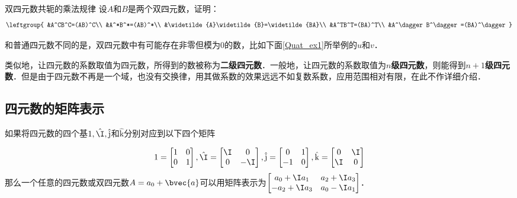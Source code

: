 \begin{exercise}{双四元数共轭的乘法规律}
设$A$和$B$是两个双四元数，证明：
\begin{equation}
\leftgroup{
&A^CB^C=(AB)^C\\
&A^*B^*=(AB)^*\\
&\widetilde{A}\widetilde{B}=\widetilde{BA}\\
&A^TB^T=(BA)^T\\
&A^\dagger B^\dagger=(BA)^\dagger
}
\end{equation}

\end{exercise}

和普通四元数不同的是，双四元数中有可能存在非零但模为0的数，比如下面\autoref{Quat_ex1}所举例的$u$和$v$．

类似地，让四元数的系数取值为四元数，所得到的数被称为\textbf{二级四元数}．一般地，让四元数的系数取值为$n$\textbf{级四元数}，则能得到$n+1$\textbf{级四元数}．但是由于四元数不再是一个域，也没有交换律，用其做系数的效果远远不如复数系数，应用范围相对有限，在此不作详细介绍．


\subsection{四元数的矩阵表示}

如果将四元数的四个基$1, \hat{\I}, \hat{\mathrm{j}}$和$\hat{\mathrm{k}}$分别对应到以下四个矩阵

\begin{equation}

1=\left[\begin{matrix}1&0\\0&1\end{matrix} \right], \hat{\I}=\left[\begin{matrix}\I&0\\0&-\I\end{matrix} \right], \hat{\mathrm{j}}=\left[\begin{matrix}0&1\\-1&0\end{matrix} \right], \hat{\mathrm{k}}=\left[\begin{matrix}0&\I\\\I&0\end{matrix} \right]

\end{equation}
那么一个任意的四元数或双四元数$A=a_0+\bvec{a}$可以用矩阵表示为$\left[\begin{matrix}a_0+\I a_1&a_2+\I a_3\\-a_2+\I a_3&a_0-\I a_1 \end{matrix} \right]$．

